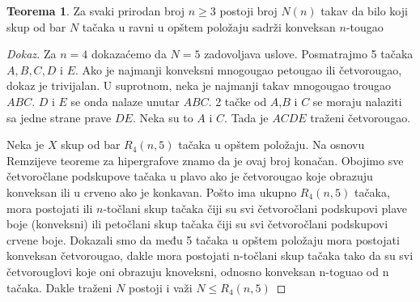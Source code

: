 \documentclass{article}
\theoremstyle{definition}
\newtheorem{teorema}{Teorema}[section]
\newcommand{\dokaz}[1]{\begin{proof}[Dokaz]#1\end{proof}}
\begin{document}
	\begin{teorema} \label{happyEnding}
		Za svaki prirodan broj $n\geq 3$ postoji broj $N(n)$ takav da bilo koji skup od bar $N$ tačaka u ravni u opštem položaju sadrži konveksan $n$-tougao
	\end{teorema}
	\dokaz{
		Za $n=4$ dokazaćemo da $N=5$ zadovoljava uslove. Posmatrajmo 5 tačaka $A,B,C,D$ i $E$. Ako je najmanji konveksni mnogougao petougao ili četvorougao, dokaz je trivijalan. U suprotnom, neka je najmanji takav mnogougao trougao $ABC$. $D$ i $E$ se onda nalaze unutar $ABC$. 2 tačke od $A$,$B$ i $C$ se moraju nalaziti sa jedne strane prave $DE$. Neka su to $A$ i $C$. Tada je $ACDE$ traženi četvorougao.
		
		Neka je $X$ skup od bar $R_4(n,5)$ tačaka u opštem položaju. Na osnovu Remzijeve teoreme za hipergrafove znamo da je ovaj broj konačan. Obojimo sve četvoročlane podskupove tačaka u plavo ako je četvorougao koje obrazuju konveksan ili u crveno ako je konkavan. Pošto ima ukupno $R_{4}(n,5)$ tačaka, mora postojati ili $n$-točlani skup tačaka čiji su svi četvoročlani podskupovi plave boje (konveksni) ili petočlani skup tačaka čiji su svi četvoročlani podskupovi crvene boje. Dokazali smo da među 5 tačaka u opštem položaju mora postojati konveksan četvorougao, dakle mora postojati n-točlani skup tačaka tako da su svi četvorouglovi koje oni obrazuju knoveksni, odnosno konveksan n-toguao od n tačaka. Dakle traženi $N$ postoji i važi $N\leq R_{4}(n,5)$
		
	}
	
\end{document}
